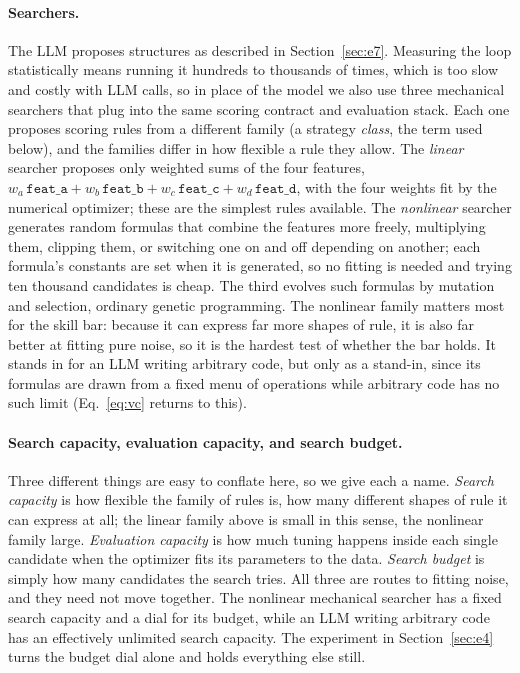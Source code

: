 \documentclass[11pt]{article}
\newcommand{\code}[1]{\texttt{#1}}
\begin{document}
\paragraph{Searchers.} The LLM proposes structures as described in Section~\ref{sec:e7}. Measuring the
loop statistically means running it hundreds to thousands of times, which is too slow and costly with
LLM calls, so in place of the model we also use three mechanical searchers that plug into the same
scoring contract and evaluation stack. Each one proposes scoring rules from a different family (a
strategy \emph{class}, the term used below), and the families differ in how flexible a rule they allow.
The \emph{linear} searcher proposes only weighted sums of the four features,
$w_a\,\code{feat\_a}+w_b\,\code{feat\_b}+w_c\,\code{feat\_c}+w_d\,\code{feat\_d}$, with the four weights
fit by the numerical optimizer; these are the simplest rules available. The \emph{nonlinear} searcher
generates random formulas that combine the features more freely, multiplying them, clipping them, or
switching one on and off depending on another; each formula's constants are set when it is generated, so
no fitting is needed and trying ten thousand candidates is cheap. The third evolves such formulas by
mutation and selection, ordinary genetic programming. The nonlinear family matters most for the skill
bar: because it can express far more shapes of rule, it is also far better at fitting pure noise, so it
is the hardest test of whether the bar holds. It stands in for an LLM writing arbitrary code, but only as
a stand-in, since its formulas are drawn from a fixed menu of operations while arbitrary code has no such
limit (Eq.~\eqref{eq:vc} returns to this).

\paragraph{Search capacity, evaluation capacity, and search budget.} Three different things are easy to conflate here, so we give
each a name. \emph{Search capacity} is how flexible the family of rules is, how many different shapes of
rule it can express at all; the linear family above is small in this sense, the nonlinear family large.
\emph{Evaluation capacity} is how much tuning happens inside each single candidate when the optimizer
fits its parameters to the data. \emph{Search budget} is simply how many candidates the search tries.
All three are routes to fitting noise, and they need not move together. The nonlinear mechanical searcher
has a fixed search capacity and a dial for its budget, while an LLM writing arbitrary code has an
effectively unlimited search capacity. The experiment in Section~\ref{sec:e4} turns the budget dial
alone and holds everything else still.
\end{document}
